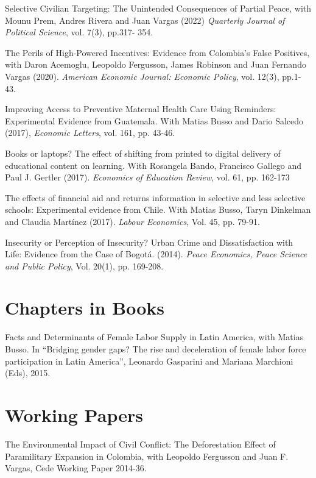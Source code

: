 \documentclass{moderncv}
\begin{document}
{Selective Civilian Targeting: The Unintended Consequences of Partial Peace, with Mounu Prem, Andres Rivera and Juan Vargas (2022) \emph{Quarterly Journal of Political Science}, vol. 7(3), pp.317- 354. \\}

{The Perils of High-Powered Incentives: Evidence from Colombia's False Positives, with Daron Acemoglu, Leopoldo Fergusson, James Robinson and Juan Fernando Vargas (2020). \emph{American Economic Journal: Economic Policy}, vol. 12(3), pp.1- 43. \\ }  

{Improving Access to Preventive Maternal Health Care Using Reminders: Experimental Evidence from Guatemala. With Matias Busso and Dario Salcedo (2017), \emph{Economic Letters}, vol. 161, pp. 43-46.\\} 

{Books or laptops? The effect of shifting from printed to digital delivery of educational content on learning. With Rosangela Bando, Francisco Gallego and Paul J. Gertler (2017). \emph{Economics of Education Review}, vol. 61, pp. 162-173\\} 

{The effects of financial aid and returns information in selective and less selective schools: Experimental evidence from Chile. With Matias Busso, Taryn Dinkelman and Claudia Martínez (2017). \emph{Labour Economics}, Vol. 45, pp. 79-91.\\}

{Insecurity or Perception of Insecurity? Urban Crime and Dissatisfaction with Life: Evidence from the Case of Bogot\'a. (2014). \emph{Peace Economics, Peace Science and Public Policy}, Vol. 20(1), pp. 169-208.}

\section{\textbf{Chapters in Books}}
{Facts and Determinants of Female Labor Supply in Latin America, with Matias Busso. In “Bridging gender gaps? The rise and deceleration of female labor force participation in Latin America”, Leonardo Gasparini and Mariana Marchioni (Eds), 2015.}

\section{\textbf{Working Papers}}
{The Environmental Impact of Civil Conflict: The Deforestation Effect of Paramilitary Expansion in Colombia, with Leopoldo Fergusson and Juan F. Vargas, Cede Working Paper 2014-36.}
\end{document}
